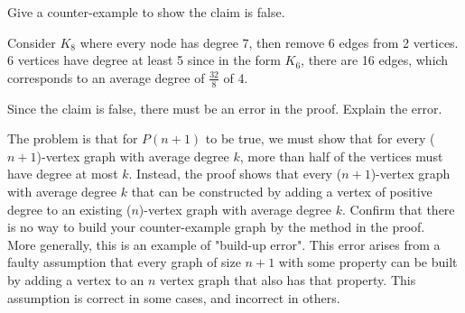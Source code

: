 \question Give a counter-example to show the claim is false.
\begin{solution}[1 in]
Consider $K_8$ where every node has degree 7, then remove 6 edges from 2 vertices. 6 vertices have degree at least 5 since in the form $K_6$, there are 16 edges, which corresponds to an average degree of $\frac{32}{8}$ of 4. 
\end{solution}


\question Since the claim is false, there must be an error in the proof. Explain the error. 
\begin{solution}[1.5 in]
The problem is that for $P(n+1)$ to be true, we must show that for every ($n+1$)-vertex graph with average degree $k$, more than half of the vertices must have degree at most $k$. Instead, the proof shows that every ($n+1$)-vertex graph with average degree $k$ that can be constructed by adding a vertex of positive degree to an existing ($n$)-vertex graph with average degree $k$. Confirm that there is no way to build your counter-example graph by the method in the proof. \\
More generally, this is an example of "build-up error". This error arises from a faulty assumption that every graph of size $n+1$ with some property can be built by adding a vertex to an $n$ vertex graph that also has that property. This assumption is correct in some cases, and incorrect in others. 
\end{solution}